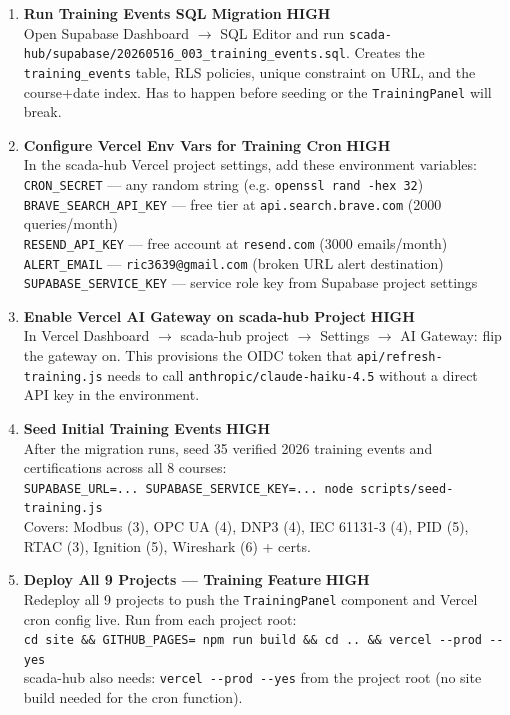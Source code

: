 \documentclass[10pt]{article}
\newcommand{\high}{\textcolor{sred}{\small\bfseries HIGH}}
\begin{document}
\begin{enumerate}[resume]\small
  \item \textbf{Run Training Events SQL Migration} \hfill \high \\
    Open Supabase Dashboard $\to$ SQL Editor and run \texttt{scada-hub/supabase/20260516\_003\_training\_events.sql}. Creates the \texttt{training\_events} table, RLS policies, unique constraint on URL, and the course+date index. Has to happen before seeding or the \texttt{TrainingPanel} will break.

  \item \textbf{Configure Vercel Env Vars for Training Cron} \hfill \high \\
    In the scada-hub Vercel project settings, add these environment variables:\\
    \texttt{CRON\_SECRET} — any random string (e.g. \texttt{openssl rand -hex 32})\\
    \texttt{BRAVE\_SEARCH\_API\_KEY} — free tier at \texttt{api.search.brave.com} (2000 queries/month)\\
    \texttt{RESEND\_API\_KEY} — free account at \texttt{resend.com} (3000 emails/month)\\
    \texttt{ALERT\_EMAIL} — \texttt{ric3639@gmail.com} (broken URL alert destination)\\
    \texttt{SUPABASE\_SERVICE\_KEY} — service role key from Supabase project settings

  \item \textbf{Enable Vercel AI Gateway on scada-hub Project} \hfill \high \\
    In Vercel Dashboard $\to$ scada-hub project $\to$ Settings $\to$ AI Gateway: flip the gateway on. This provisions the OIDC token that \texttt{api/refresh-training.js} needs to call \texttt{anthropic/claude-haiku-4.5} without a direct API key in the environment.

  \item \textbf{Seed Initial Training Events} \hfill \high \\
    After the migration runs, seed 35 verified 2026 training events and certifications across all 8 courses:\\
    \texttt{SUPABASE\_URL=... SUPABASE\_SERVICE\_KEY=... node scripts/seed-training.js}\\
    Covers: Modbus (3), OPC UA (4), DNP3 (4), IEC 61131-3 (4), PID (5), RTAC (3), Ignition (5), Wireshark (6) + certs.

  \item \textbf{Deploy All 9 Projects — Training Feature} \hfill \high \\
    Redeploy all 9 projects to push the \texttt{TrainingPanel} component and Vercel cron config live. Run from each project root:\\
    \texttt{cd site \&\& GITHUB\_PAGES= npm run build \&\& cd .. \&\& vercel -{-}prod -{-}yes}\\
    scada-hub also needs: \texttt{vercel -{-}prod -{-}yes} from the project root (no site build needed for the cron function).


\end{enumerate}
\end{document}
